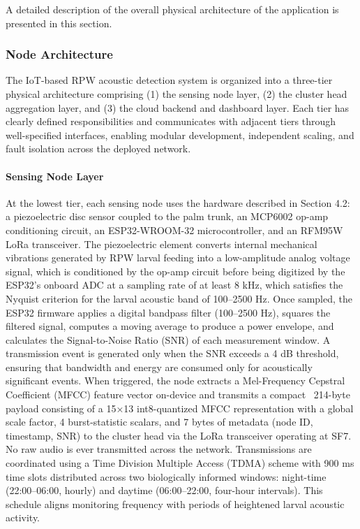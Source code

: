 \documentclass[12pt,a4paper,oneside]{memoir}
\begin{document}
A detailed description of the overall physical architecture of the application is presented in this section.

\subsubsection{Node Architecture}

The IoT-based RPW acoustic detection system is organized into a three-tier physical architecture comprising (1) the sensing node layer, (2) the cluster head aggregation layer, and (3) the cloud backend and dashboard layer. Each tier has clearly defined responsibilities and communicates with adjacent tiers through well-specified interfaces, enabling modular development, independent scaling, and fault isolation across the deployed network.

\paragraph{Sensing Node Layer} 

At the lowest tier, each sensing node uses the hardware described in Section 4.2: a piezoelectric disc sensor coupled to the palm trunk, an MCP6002 op-amp conditioning circuit, an ESP32-WROOM-32 microcontroller, and an RFM95W LoRa transceiver. The piezoelectric element converts internal mechanical vibrations generated by RPW larval feeding into a low-amplitude analog voltage signal, which is conditioned by the op-amp circuit before being digitized by the ESP32's onboard ADC at a sampling rate of at least 8 kHz, which satisfies the Nyquist criterion for the larval acoustic band of 100--2500 Hz. Once sampled, the ESP32 firmware applies a digital bandpass filter (100--2500 Hz), squares the filtered signal, computes a moving average to produce a power envelope, and calculates the Signal-to-Noise Ratio (SNR) of each measurement window. A transmission event is generated only when the SNR exceeds a 4 dB threshold, ensuring that bandwidth and energy are consumed only for acoustically significant events. When triggered, the node extracts a Mel-Frequency Cepstral Coefficient (MFCC) feature vector on-device and transmits a compact ~214-byte payload consisting of a 15×13 int8-quantized MFCC representation with a global scale factor, 4 burst-statistic scalars, and 7 bytes of metadata (node ID, timestamp, SNR) to the cluster head via the LoRa transceiver operating at SF7. No raw audio is ever transmitted across the network. Transmissions are coordinated using a Time Division Multiple Access (TDMA) scheme with 900 ms time slots distributed across two biologically informed windows: night-time (22:00--06:00, hourly) and daytime (06:00--22:00, four-hour intervals). This schedule aligns monitoring frequency with periods of heightened larval acoustic activity.
\end{document}
